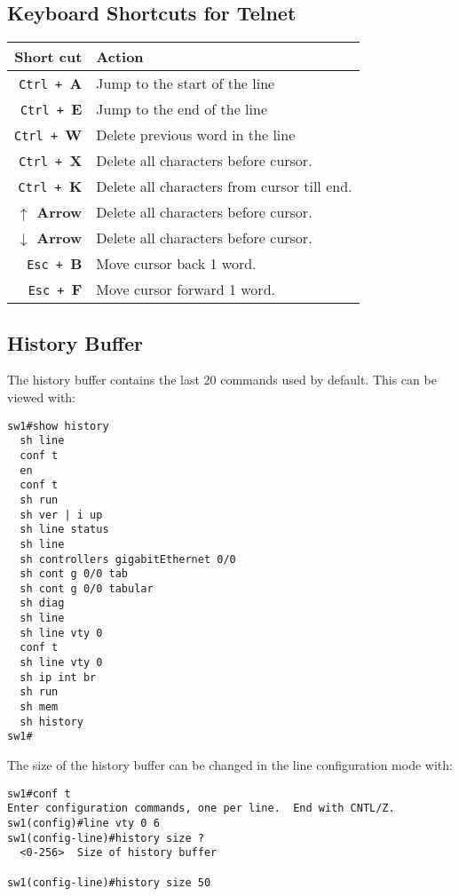 \subsection{Keyboard Shortcuts for Telnet}
\noindent
\begin{center}
	\begin{tabular}{rl}
		\toprule
		\textbf{Short cut} &\textbf{Action} \\
		\midrule
		\verb|Ctrl + |\textbf{A}	&Jump to the start of the line\\
		\verb|Ctrl + |\textbf{E}	&Jump to the end of the line\\
		\verb|Ctrl + |\textbf{W}	&Delete previous word in the line\\
		\verb|Ctrl + |\textbf{X}	&Delete all characters before cursor.\\
		\verb|Ctrl + |\textbf{K}	&Delete all characters from cursor till end.\\
		\textbf{$\uparrow$ Arrow}	&Delete all characters before cursor.\\
		\textbf{$\downarrow$ Arrow}	&Delete all characters before cursor.\\
		\verb|Esc + |\textbf{B}	&Move cursor back 1 word.\\
		\verb|Esc + |\textbf{F}	&Move cursor forward 1 word.\\
		\bottomrule
	\end{tabular}
\end{center}

\subsection{History Buffer}
The history buffer contains the last 20 commands used by default. This can be viewed with: 

\vspace{-15pt}
\begin{verbatim}
sw1#show history
  sh line
  conf t
  en
  conf t
  sh run
  sh ver | i up
  sh line status
  sh line
  sh controllers gigabitEthernet 0/0
  sh cont g 0/0 tab
  sh cont g 0/0 tabular
  sh diag
  sh line
  sh line vty 0
  conf t
  sh line vty 0
  sh ip int br
  sh run
  sh mem
  sh history
sw1#
\end{verbatim}
\vspace{-10pt}

\noindent
The size of the history buffer can be changed in the line configuration mode with:

\vspace{-15pt}
\begin{verbatim}
sw1#conf t
Enter configuration commands, one per line.  End with CNTL/Z.
sw1(config)#line vty 0 6
sw1(config-line)#history size ?
  <0-256>  Size of history buffer

sw1(config-line)#history size 50
\end{verbatim}
\vspace{-10pt}


